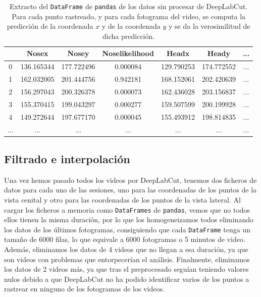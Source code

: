 \begin{table}[h]
  \centering
  \begin{tabular}{|c|c|c|c|c|c|c|}
  \hline
    & Nosex & Nosey & Noselikelihood & Headx & Heady & ... \\
  \hline
  0 & 136.165344 & 177.722496 & 0.000084 & 129.790253 & 174.772552 & ... \\
  1 & 162.032005 & 201.444756 & 0.942181 & 168.152061 & 202.420639 & ... \\
  2 & 156.297043 & 200.326378 & 0.000073 & 162.436028 & 203.156837 & ... \\
  3 & 155.370415 & 199.043297 & 0.000277 & 159.507599 & 200.199928 & ... \\
  4 & 149.272644 & 197.677170 & 0.000045 & 155.493912 & 198.814835 & ... \\
  ... & ... & ... & ... & ... & ... & ... \\
  \hline
  \end{tabular}
  \caption[Datos de DeepLabCut]{Extracto del \texttt{DataFrame} de \texttt{pandas} de los datos sin procesar de DeepLabCut. Para cada punto rastreado, y para cada fotograma del video, se computa la predicción de la coordenada $x$ y de la coordenada $y$ y se da la verosimilitud de dicha predicción.}
  \label{tab:df-example}
\end{table}

\subsection{Filtrado e interpolación}
Una vez hemos pasado todos los videos por DeepLabCut, tenemos dos ficheros de datos para cada uno de las sesiones, uno para las coordenadas de los puntos de la vista cenital y otro para las coordenadas de los puntos de la vista lateral. Al cargar los ficheros a memoria como \texttt{DataFrames} de \texttt{pandas}, vemos que no todos ellos tienen la misma duración, por lo que los homogeneizamos todos eliminando los datos de los últimos fotogramas, consiguiendo que cada \texttt{DataFrame} tenga un tamaño de 6000 filas, lo que equivale a 6000 fotogramas o 5 minutos de video. Además, eliminamos los datos de 4 videos que no llegan a esa duración, ya que son videos con problemas que entorpecerían el análisis. Finalmente, eliminamos los datos de 2 videos más, ya que tras el preprocesado seguían teniendo valores nulos debido a que DeepLabCut no ha podido identificar varios de los puntos a rastrear en ninguno de los fotogramas de los videos.


